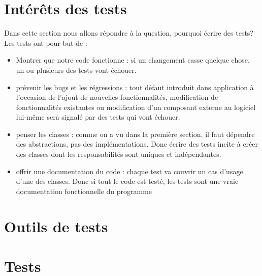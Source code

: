 \section{Intérêts des tests} %
\label{sub:pourquoi_tester_}
Dans cette section nous allons répondre à la question, pourquoi écrire des tests?\newline
Les tests ont pour but de :
\begin{itemize}
	\item Montrer que notre code fonctionne :  si un changement casse quelque chose, un ou plusieurs des tests vont échouer.
	\item prévenir les bugs et les régressions : tout défaut introduit dans application à l'occasion de l'ajout de nouvelles fonctionnalités, modification de fonctionnalités existantes ou modification d'un composant externe au logiciel lui-même sera signalé par des tests qui vont échouer.
	\item penser les classes : comme on a vu dans la première section, il faut dépendre des abstractions, pas des implémentations. Donc écrire des tests incite à créer des classes dont les responsabilités sont uniques et indépendantes.
	\item offrir une documentation du code : chaque test va couvrir un cas d'usage d'une des classes. Donc si tout le code est testé, les tests sont une vraie documentation fonctionnelle du programme
\end{itemize} 

\section{Outils de tests} %
\label{sub:outils_de_tests}


\section{Tests} %
\label{sub:tests}

